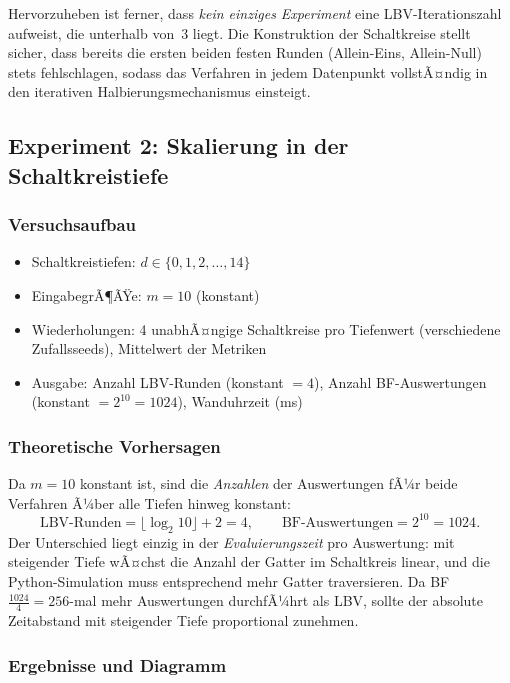 ﻿\documentclass[a4paper,12pt]{article}
\theoremstyle{definition}
\begin{document}
Hervorzuheben ist ferner, dass \emph{kein einziges Experiment} eine LBV-Iterationszahl
aufweist, die unterhalb von~$3$ liegt.  Die Konstruktion der Schaltkreise stellt
sicher, dass bereits die ersten beiden festen Runden (Allein-Eins, Allein-Null)
stets fehlschlagen, sodass das Verfahren in jedem Datenpunkt vollstÃ¤ndig in den
iterativen Halbierungsmechanismus einsteigt.

\subsection{Experiment 2: Skalierung in der Schaltkreistiefe}
\label{subsec:exp2}

\subsubsection{Versuchsaufbau}

\begin{itemize}
  \item Schaltkreistiefen: $d \in \{0, 1, 2, \ldots, 14\}$
  \item EingabegrÃ¶ÃŸe: $m = 10$ (konstant)
  \item Wiederholungen: 4 unabhÃ¤ngige Schaltkreise pro Tiefenwert (verschiedene
    Zufallsseeds), Mittelwert der Metriken
  \item Ausgabe: Anzahl LBV-Runden (konstant $= 4$), Anzahl BF-Auswertungen
    (konstant $= 2^{10} = 1024$), Wanduhrzeit (ms)
\end{itemize}

\subsubsection{Theoretische Vorhersagen}

Da $m = 10$ konstant ist, sind die \emph{Anzahlen} der Auswertungen fÃ¼r beide
Verfahren Ã¼ber alle Tiefen hinweg konstant:
\[
  \text{LBV-Runden} = \lfloor \log_2 10 \rfloor + 2 = 4,
  \qquad
  \text{BF-Auswertungen} = 2^{10} = 1024.
\]
Der Unterschied liegt einzig in der \emph{Evaluierungszeit} pro Auswertung: mit
steigender Tiefe wÃ¤chst die Anzahl der Gatter im Schaltkreis linear, und die
Python-Simulation muss entsprechend mehr Gatter traversieren.  Da BF $\frac{1024}{4} = 256$-mal
mehr Auswertungen durchfÃ¼hrt als LBV, sollte der absolute Zeitabstand mit
steigender Tiefe proportional zunehmen.

\subsubsection{Ergebnisse und Diagramm}
\end{document}

